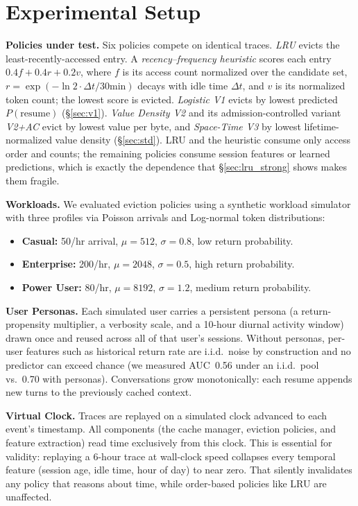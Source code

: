 \documentclass[letterpaper,twocolumn,10pt]{article}
\begin{document}
\section{Experimental Setup}
\label{sec:setup}

\textbf{Policies under test.} Six policies compete on identical traces. \emph{LRU} evicts the least-recently-accessed entry. A \emph{recency--frequency heuristic} scores each entry $0.4f + 0.4r + 0.2v$, where $f$ is its access count normalized over the candidate set, $r = \exp(-\ln 2 \cdot \Delta t / 30\text{min})$ decays with idle time $\Delta t$, and $v$ is its normalized token count; the lowest score is evicted. \emph{Logistic V1} evicts by lowest predicted $P(\text{resume})$ (\S\ref{sec:v1}). \emph{Value Density V2} and its admission-controlled variant \emph{V2+AC} evict by lowest value per byte, and \emph{Space-Time V3} by lowest lifetime-normalized value density (\S\ref{sec:std}). LRU and the heuristic consume only access order and counts; the remaining policies consume session features or learned predictions, which is exactly the dependence that \S\ref{sec:lru_strong} shows makes them fragile.

\textbf{Workloads.} We evaluated eviction policies using a synthetic workload simulator with three profiles via Poisson arrivals and Log-normal token distributions:
\begin{itemize}
  \item \textbf{Casual:} 50/hr arrival, $\mu{=}512$, $\sigma{=}0.8$, low return probability.
  \item \textbf{Enterprise:} 200/hr, $\mu{=}2048$, $\sigma{=}0.5$, high return probability.
  \item \textbf{Power User:} 80/hr, $\mu{=}8192$, $\sigma{=}1.2$, medium return probability.
\end{itemize}

\textbf{User Personas.} Each simulated user carries a persistent persona (a return-propensity multiplier, a verbosity scale, and a 10-hour diurnal activity window) drawn once and reused across all of that user's sessions. Without personas, per-user features such as historical return rate are i.i.d.\ noise by construction and no predictor can exceed chance (we measured AUC~0.56 under an i.i.d.\ pool vs.\ 0.70 with personas). Conversations grow monotonically: each resume appends new turns to the previously cached context.

\textbf{Virtual Clock.} Traces are replayed on a simulated clock advanced to each event's timestamp. All components (the cache manager, eviction policies, and feature extraction) read time exclusively from this clock. This is essential for validity: replaying a 6-hour trace at wall-clock speed collapses every temporal feature (session age, idle time, hour of day) to near zero. That silently invalidates any policy that reasons about time, while order-based policies like LRU are unaffected.
\end{document}
